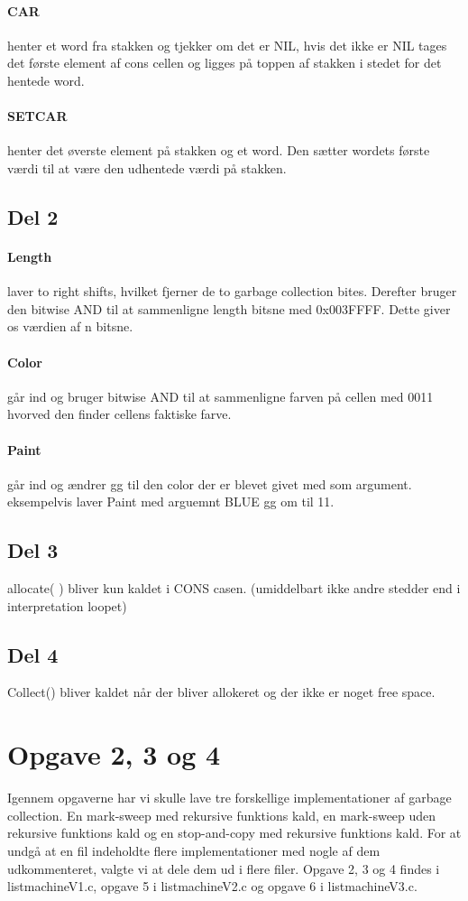 	\paragraph{CAR} henter et word fra stakken og tjekker om det er NIL, hvis det ikke er NIL tages det første element af cons cellen og ligges på toppen af stakken i stedet for det hentede word.
	\paragraph{SETCAR} henter det øverste element på stakken og et word. Den sætter wordets første værdi til at være den udhentede værdi på stakken.

\subsection{Del 2}
\label{O1_2}
	\paragraph{Length} laver to right shifts, hvilket fjerner de to garbage collection bites. Derefter bruger den bitwise AND til at sammenligne length bitsne med 0x003FFFF. Dette giver os værdien af n bitsne.
	\paragraph{Color} går ind og bruger bitwise AND til at sammenligne farven på cellen med 0011 hvorved den finder cellens faktiske farve.
	\paragraph{Paint} går ind og ændrer gg til den color der er blevet givet med som argument. eksempelvis laver Paint med arguemnt BLUE gg om til 11.

\subsection{Del 3}
\label{O1_3}
allocate( ) bliver kun kaldet i CONS casen.  (umiddelbart ikke andre stedder end i interpretation loopet)

\subsection{Del 4}
\label{O1_4}
Collect() bliver kaldet når der bliver allokeret og der ikke er noget free space.

\section{Opgave 2, 3 og 4}
\label{O2}
Igennem opgaverne har vi skulle lave tre forskellige implementationer af garbage collection. En mark-sweep med rekursive funktions kald, en mark-sweep uden rekursive funktions kald og en stop-and-copy med rekursive funktions kald. For at undgå at en fil indeholdte flere implementationer med nogle af dem udkommenteret, valgte vi at dele dem ud i flere filer. Opgave 2, 3 og 4 findes i listmachineV1.c, opgave 5 i listmachineV2.c og opgave 6 i listmachineV3.c.

